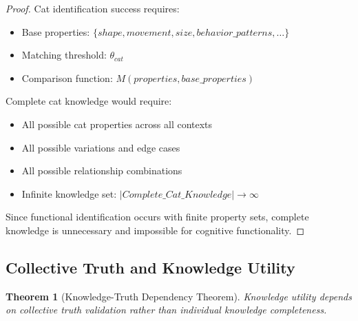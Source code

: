 \documentclass[12pt,a4paper]{article}
\newtheorem{theorem}{Theorem}[section]
\begin{document}
\begin{proof}
Cat identification success requires:
\begin{itemize}
\item Base properties: $\{shape, movement, size, behavior\_patterns, \ldots\}$
\item Matching threshold: $\theta_{cat}$
\item Comparison function: $M(properties, base\_properties)$
\end{itemize}

Complete cat knowledge would require:
\begin{itemize}
\item All possible cat properties across all contexts
\item All possible variations and edge cases  
\item All possible relationship combinations
\item Infinite knowledge set: $|Complete\_Cat\_Knowledge| \rightarrow \infty$
\end{itemize}

Since functional identification occurs with finite property sets, complete knowledge is unnecessary and impossible for cognitive functionality.
\end{proof}

\subsection{Collective Truth and Knowledge Utility}

\begin{theorem}[Knowledge-Truth Dependency Theorem]
Knowledge utility depends on collective truth validation rather than individual knowledge completeness.
\end{theorem}
\end{document}
